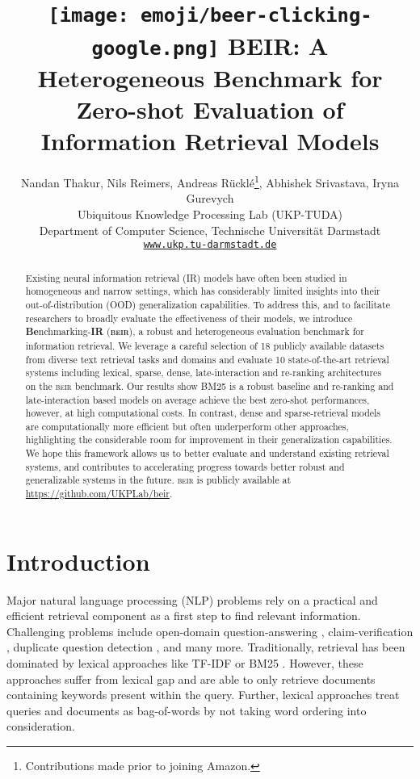 \documentclass{article}
\title{\texttt{[image: emoji/beer-clicking-google.png]} BEIR: A Heterogeneous Benchmark for Zero-shot Evaluation of Information Retrieval Models}
\author{Nandan Thakur, Nils Reimers, Andreas R\"uckl\'e\thanks{Contributions made prior to joining Amazon.}, Abhishek Srivastava, Iryna Gurevych \\
  Ubiquitous Knowledge Processing Lab (UKP-TUDA) \\
  Department of Computer Science, Technische Universit{\"a}t Darmstadt \\
  \href{https://www.informatik.tu-darmstadt.de/ukp/ukp_home/index.en.jsp}{\texttt{www.ukp.tu-darmstadt.de}}}
\newcommand{\custo}[1]{\textsc{\normalsize #1}}
\newcommand{\beir}{\custo{beir}\xspace}
\begin{document}
\maketitle

\begin{abstract}
Existing neural information retrieval (IR) models have often been studied in homogeneous and narrow settings, which has considerably limited insights into their out-of-distribution (OOD) generalization capabilities. To address this, and to facilitate researchers to broadly evaluate the effectiveness of their models, we introduce \textbf{Be}nchmarking-\textbf{IR} (\textbf{\beir}), a robust and heterogeneous evaluation benchmark for information retrieval. We leverage a careful selection of 18 publicly available datasets from diverse text retrieval tasks and domains and evaluate 10 state-of-the-art retrieval systems including lexical, sparse, dense, late-interaction and re-ranking architectures on the \beir benchmark. 
Our results show BM25 is a robust baseline and re-ranking and late-interaction based models on average achieve the best zero-shot performances, however, at high computational costs. In contrast, dense and sparse-retrieval models are computationally more efficient but often underperform other approaches, highlighting the considerable room for improvement in their generalization capabilities. 
We hope this framework allows us to better evaluate and understand existing retrieval systems, and contributes to accelerating progress towards better robust and generalizable systems in the future. \beir is publicly available at \url{https://github.com/UKPLab/beir}.
\end{abstract}

\vspace{-3mm}
\section{Introduction}
\vspace{-1mm}

Major natural language processing (NLP) problems rely on a practical and efficient retrieval component as a first step to find relevant information. Challenging problems include open-domain question-answering \cite{chen-etal-2017-reading}, claim-verification \cite{thorne-etal-2018-fever}, duplicate question detection \cite{zhang2015multi}, and many more. Traditionally, retrieval has been dominated by lexical approaches like TF-IDF or BM25 \cite{bm25}. However, these approaches suffer from lexical gap \cite{berger2000bridging} and are able to only retrieve documents containing keywords present within the query. Further, lexical approaches treat queries and documents as bag-of-words by not taking word ordering into consideration.
\end{document}
